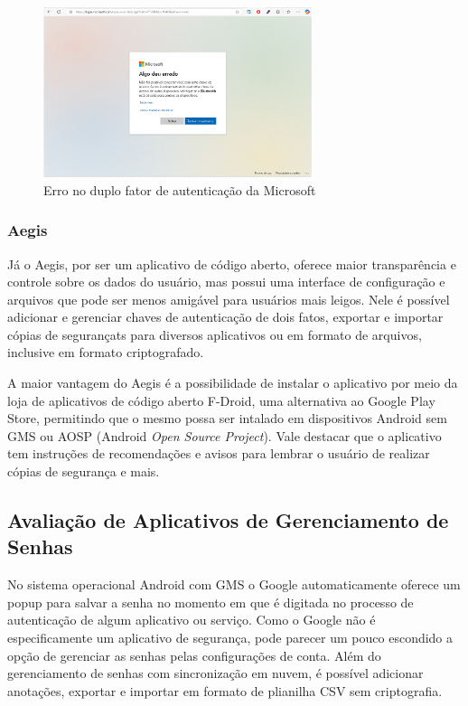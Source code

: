 \documentclass[12pt]{article}
\begin{document}
\begin{figure}[h!]
  \centering
  \includegraphics[width=0.7\textwidth]{./assets/microsoft_error_2.png}
  \caption{Erro no duplo fator de autenticação da Microsoft}
  \label{fig:Microsoft2FactoryAutenticatorError}
\end{figure}

\subsubsection{Aegis}

Já o Aegis, por ser um aplicativo de código aberto, oferece maior transparência
e controle sobre os dados do usuário, mas possui uma interface de configuração
e arquivos que pode ser menos amigável para usuários mais leigos.
Nele é possível adicionar e gerenciar chaves de autenticação de dois fatos,
exportar e importar cópias de segurançats para diversos aplicativos ou em formato de arquivos,
inclusive em formato criptografado.

A maior vantagem do Aegis é a possibilidade de instalar o aplicativo por meio da
loja de aplicativos de código aberto F-Droid, uma alternativa ao Google Play
Store, permitindo que o mesmo possa ser intalado em dispositivos Android sem GMS
ou AOSP (Android \textit{Open Source Project}).
Vale destacar que o aplicativo tem instruções de recomendações e avisos para lembrar o usuário
de realizar cópias de segurança e mais.

\subsection{Avaliação de Aplicativos de Gerenciamento de Senhas}

No sistema operacional Android com GMS o Google automaticamente oferece um popup
para salvar a senha no momento em que é digitada no processo de autenticação de
algum aplicativo ou serviço.
Como o Google não é especificamente um aplicativo de segurança, pode parecer um
pouco escondido a opção de gerenciar as senhas pelas configurações de conta.
Além do gerenciamento de senhas com sincronização em nuvem, é possível adicionar
anotações, exportar e importar em formato de plianilha CSV sem criptografia.
\end{document}
